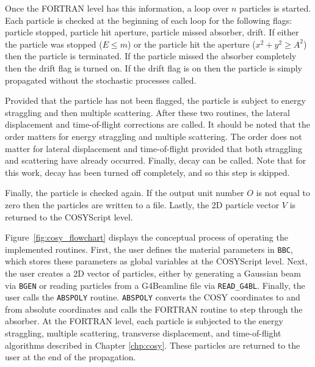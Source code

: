 Once the FORTRAN level has this information, a loop over $n$ particles is started. Each particle is checked at the beginning of each loop for the following flags: particle stopped, particle hit aperture, particle missed absorber, drift. If either the particle was stopped ($E\leq m$) or the particle hit the aperture ($x^2+y^2\geq A^2$) then the particle is terminated. If the particle missed the absorber completely then the drift flag is turned on. If the drift flag is on then the particle is simply propagated without the stochastic processes called.

Provided that the particle has not been flagged, the particle is subject to energy straggling and then multiple scattering. After these two routines, the lateral displacement and time-of-flight corrections are called. It should be noted that the order matters for energy straggling and multiple scattering. The order does not matter for lateral displacement and time-of-flight provided that both straggling and scattering have already occurred. Finally, decay can be called. Note that for this work, decay has been turned off completely, and so this step is skipped.

Finally, the particle is checked again. If the output unit number $O$ is not equal to zero then the particles are written to a file. Lastly, the 2D particle vector $V$ is returned to the COSYScript level.


Figure~\ref{fig:cosy_flowchart} displays the conceptual process of operating the implemented routines. First, the user defines the material parameters in \texttt{BBC}, which stores these parameters as global variables at the COSYScript level. Next, the user creates a 2D vector of particles, either by generating a Gaussian beam via \texttt{BGEN} or reading particles from a G4Beamline file via \verb|READ_G4BL|. Finally, the user calls the \texttt{ABSPOLY} routine. \texttt{ABSPOLY} converts the COSY coordinates to and from absolute coordinates and calls the FORTRAN routine to step through the absorber. At the FORTRAN level, each particle is subjected to the energy straggling, multiple scattering, transverse displacement, and time-of-flight algorithms described in Chapter \ref{chp:cosy}. These particles are returned to the user at the end of the propagation.